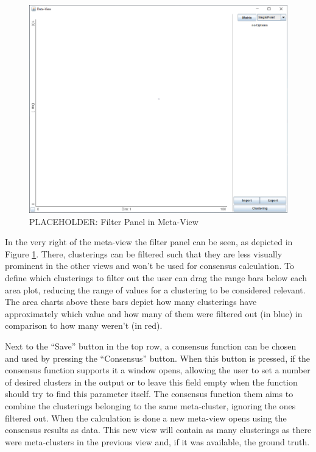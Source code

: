 \documentclass[
	a4paper,
	english,
	twoside,
	openright,               
	11pt                            
	]{report}
\begin{document}
\begin{figure}[h]
	\centering
	\includegraphics[scale=.45]{data-view}
	\caption{PLACEHOLDER: Filter Panel in Meta-View }
	\label{fig:filterpanel}
\end{figure}

In the very right of the meta-view the filter panel can be seen, as depicted in Figure \ref{fig:filterpanel}. There, clusterings can be filtered such that they are less visually prominent in the other views and won't be used for consensus calculation. To define which clusterings to filter out the user can drag the range bars below each area plot, reducing the range of values for a clustering to be considered relevant. The area charts above these bars depict how many clusterings have approximately which value and how many of them were filtered out (in blue) in comparison to how many weren't (in red).

Next to the ``Save'' button in the top row, a consensus function can be chosen and used by pressing the ``Consensus'' button. When this button is pressed, if the consensus function supports it a window opens, allowing the user to set a number of desired clusters in the output or to leave this field empty when the function should try to find this parameter itself. The consensus function them aims to combine the clusterings belonging to the same meta-cluster, ignoring the ones filtered out. When the calculation is done a new meta-view opens using the consensus results as data. This new view will contain as many clusterings as there were meta-clusters in the previous view and, if it was available, the ground truth.
\end{document}
